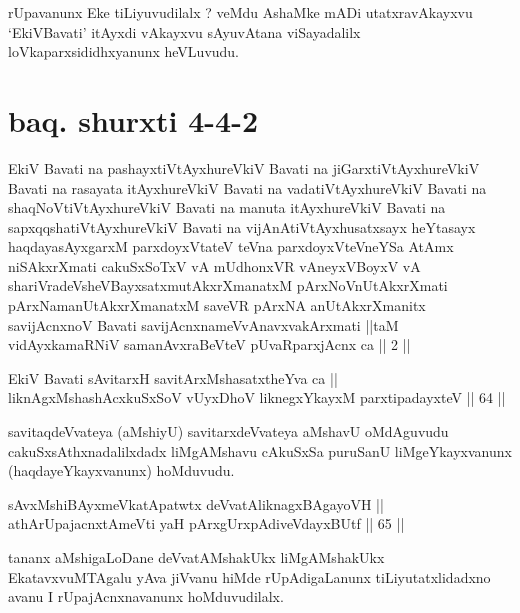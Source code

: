 \begin{artha}
rUpavanunx Eke tiLiyuvudilalx ? veMdu AshaMke mADi utatxravAkayxvu
`EkiVBavati' itAyxdi vAkayxvu sAyuvAtana viSayadalilx
loVkaparxsididhxyanunx heVLuvudu.
\end{artha}

\section*{baq. shurxti 4-4-2}

\begin{shl}
EkiV Bavati na pashayxtiVtAyxhureVkiV Bavati na jiGarxtiVtAyxhureVkiV Bavati na rasayata itAyxhureVkiV Bavati na vadatiVtAyxhureVkiV Bavati na shaqNoVtiVtAyxhureVkiV Bavati na manuta itAyxhureVkiV Bavati na sapxqqshatiVtAyxhureVkiV Bavati na vijAnAtiVtAyxhusatxsayx heYtasayx haqdayasAyxgarxM parxdoyxVtateV teVna parxdoyxVteVneYSa AtAmx niSAkxrXmati cakuSxSoTxV vA mUdhonxVR vAneyxVBoyxV vA shariVradeVsheVBayxsatxmutAkxrXmanatxM pArxNoV\s nUtAkxrXmati pArxNamanUtAkxrXmanatxM saveVR pArxNA anUtAkxrXmanitx savijAcnxnoV Bavati savijAcnxnameVvAnavxvakArxmati ||taM vidAyxkamaRNiV samanAvxraBeVteV pUvaRparxjAcnx ca || 2 ||
\end{shl}

\begin{shl}
EkiV Bavati sAvitarxH savitArxM\s shasatxtheYva ca || \\
liknAgxMshashAcxkuSxSoV vUyxDhoV liknegxYkayxM parxtipadayxteV \hfill || 64 ||  
\end{shl}

\begin{artha}
savitaqdeVvateya (aMshiyU) savitarxdeVvateya aMshavU oMdAguvudu
cakuSxsAthxnadalilxdadx liMgAMshavu cAkuSxSa puruSanU liMgeYkayxvanunx
(haqdayeYkayxvanunx) hoMduvudu.
\end{artha}


\begin{shl}
sAvxMshiBAyxmeVkatApatwtx deVvatAliknagxBAgayoVH || \\
athArUpajacnxtAmeVti yaH pArxgUrxpAdiveVdayxBUtf \hfill || 65 ||  
\end{shl}

\begin{artha}
tananx aMshigaLoDane deVvatAMshakUkx liMgAMshakUkx EkatavxvuMTAgalu
yAva jiVvanu hiMde rUpAdigaLanunx tiLiyutatxlidadxno avanu I
rUpajAcnxnavanunx hoMduvudilalx.
\end{artha}

